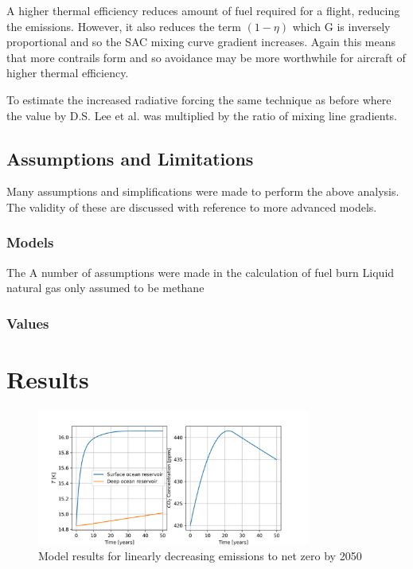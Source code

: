 \documentclass{article}
\begin{document}
A higher thermal efficiency reduces amount of fuel required for a flight, reducing the emissions.
However, it also reduces the term $(1-\eta)$ which G is inversely proportional and so the SAC mixing curve gradient increases.
Again this means that more contrails form and so avoidance may be more worthwhile for aircraft of higher thermal efficiency.

To estimate the increased radiative forcing the same technique as before where the value by D.S. Lee et al. was multiplied by the ratio
of mixing line gradients.


\subsection{Assumptions and Limitations}

Many assumptions and simplifications were made to perform the above analysis.
The validity of these are discussed with reference to more advanced models.

\subsubsection{Models}

The 
A number of assumptions were made in the calculation of fuel burn
Liquid natural gas only assumed to be methane

\subsubsection{Values}






\section{Results}

\begin{figure}[H]
    \centering
    \includegraphics[width=0.8\textwidth]{figures/model.png}
    \caption{Model results for linearly decreasing emissions to net zero by 2050}
\end{figure}
\end{document}
